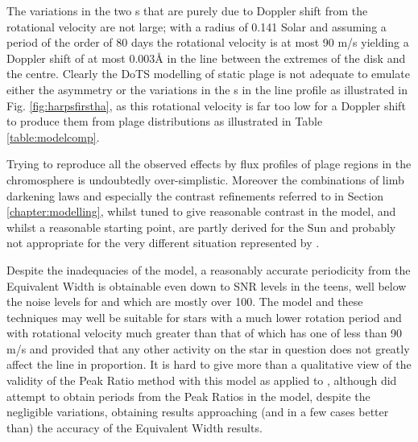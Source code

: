 The variations in the two \horn s that are purely due to Doppler shift from the rotational velocity are not large; with
a radius of 0.141 Solar \citep{demory09} and assuming a period of the order of 80 days the rotational velocity is at
most 90 m/s yielding a Doppler shift of at most 0.003{\AA} in the {\ha} line between the extremes of the disk and the
centre. Clearly the DoTS modelling of static plage is not adequate to emulate either the asymmetry or the variations in the
\horn s in the {\ha} line profile as illustrated in Fig. \ref{fig:harpsfirstha}, as this rotational velocity is far too
low for a Doppler shift to produce them from plage distributions as illustrated in Table \ref{table:modelcomp}.

Trying to reproduce all the observed effects by flux profiles of plage regions in the chromosphere is undoubtedly
over-simplistic. Moreover the combinations of limb darkening laws and especially the contrast refinements referred to in
Section \ref{chapter:modelling}, whilst tuned to give reasonable contrast in the model, and whilst a reasonable starting
point, are partly derived for the Sun and probably not appropriate for the very different situation represented by
\prox.

Despite the inadequacies of the model, a reasonably accurate periodicity from the {\ha} Equivalent Width is obtainable
even down to SNR levels in the teens, well below the noise levels for {\harps} and {\uves} which are mostly over
100. The model and these techniques may well be suitable for stars with a much lower rotation period and with rotational
velocity much greater than that of {\prox} which has one of less than 90 m/s and provided that any other activity on the
star in question does not greatly affect the {\ha} line in proportion. It is hard to give more than a qualitative view
of the validity of the Peak Ratio method with this model as applied to \prox, although {\Firstp} did attempt to obtain
periods from the Peak Ratios in the model, despite the negligible variations, obtaining results approaching (and in a
few cases better than) the accuracy of the Equivalent Width results.

